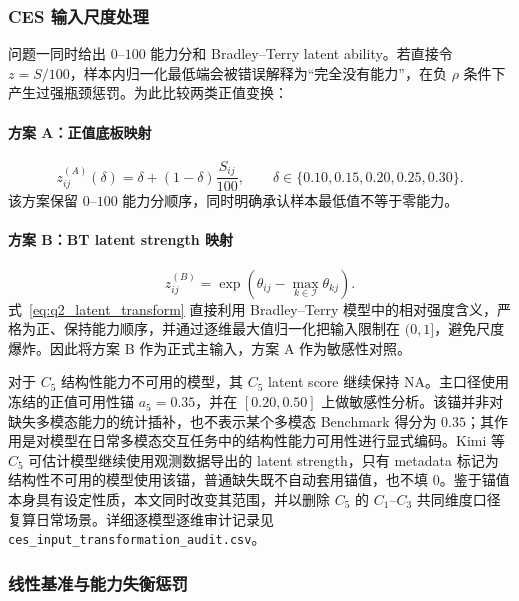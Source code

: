 \subsubsection{CES 输入尺度处理}

问题一同时给出 $0$--$100$ 能力分和 Bradley--Terry latent ability。若直接令 $z=S/100$，样本内归一化最低端会被错误解释为“完全没有能力”，在负 $\rho$ 条件下产生过强瓶颈惩罚。为此比较两类正值变换：

\paragraph{方案 A：正值底板映射}
\begin{equation}
z_{ij}^{(A)}(\delta)
=\delta+(1-\delta)\frac{S_{ij}}{100},
\qquad \delta\in\{0.10,0.15,0.20,0.25,0.30\}.
\label{eq:q2_floor_transform}
\end{equation}
该方案保留 $0$--$100$ 能力分顺序，同时明确承认样本最低值不等于零能力。

\paragraph{方案 B：BT latent strength 映射}
\begin{equation}
z_{ij}^{(B)}
=\exp\!\left(\theta_{ij}-\max_{k\in\mathcal I}\theta_{kj}\right).
\label{eq:q2_latent_transform}
\end{equation}
式~\eqref{eq:q2_latent_transform} 直接利用 Bradley--Terry 模型中的相对强度含义，严格为正、保持能力顺序，并通过逐维最大值归一化把输入限制在 $(0,1]$，避免尺度爆炸。因此将方案 B 作为正式主输入，方案 A 作为敏感性对照。

对于 $C_5$ 结构性能力不可用的模型，其 $C_5$ latent score 继续保持 NA。主口径使用冻结的正值可用性锚 $a_5=0.35$，并在 $[0.20,0.50]$ 上做敏感性分析。该锚并非对缺失多模态能力的统计插补，也不表示某个多模态 Benchmark 得分为 $0.35$；其作用是对模型在日常多模态交互任务中的结构性能力可用性进行显式编码。Kimi 等 $C_5$ 可估计模型继续使用观测数据导出的 latent strength，只有 metadata 标记为结构性不可用的模型使用该锚，普通缺失既不自动套用锚值，也不填 0。鉴于锚值本身具有设定性质，本文同时改变其范围，并以删除 $C_5$ 的 $C_1$--$C_3$ 共同维度口径复算日常场景。详细逐模型逐维审计记录见 \texttt{ces\_input\_transformation\_audit.csv}。

\subsubsection{线性基准与能力失衡惩罚}

